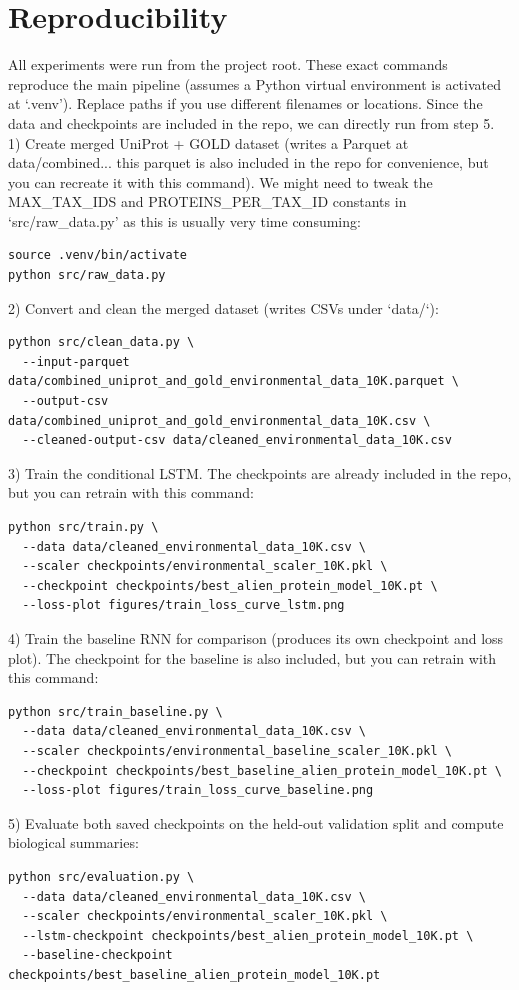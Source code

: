 \documentclass[11pt]{article}
\begin{document}
\section{Reproducibility}
All experiments were run from the project root. These exact commands reproduce
the main pipeline (assumes a Python virtual environment is activated at
`.venv'). Replace paths if you use different filenames or locations. Since 
the data and checkpoints are included in the repo, we can directly run from step 5.\\
1) Create merged UniProt + GOLD dataset (writes a Parquet at data/combined... this parquet is also included in the repo for convenience, but you can recreate it with this command). We might need to tweak the MAX\_TAX\_IDS and PROTEINS\_PER\_TAX\_ID constants in `src/raw\_data.py' as this is usually very time consuming:
\begin{verbatim}
source .venv/bin/activate
python src/raw_data.py
\end{verbatim}
2) Convert and clean the merged dataset (writes CSVs under `data/`):
\begin{verbatim}
python src/clean_data.py \
  --input-parquet data/combined_uniprot_and_gold_environmental_data_10K.parquet \
  --output-csv data/combined_uniprot_and_gold_environmental_data_10K.csv \
  --cleaned-output-csv data/cleaned_environmental_data_10K.csv
\end{verbatim}
3) Train the conditional LSTM. The checkpoints are already included in the repo, but you can retrain with this command:
\begin{verbatim}
python src/train.py \
  --data data/cleaned_environmental_data_10K.csv \
  --scaler checkpoints/environmental_scaler_10K.pkl \
  --checkpoint checkpoints/best_alien_protein_model_10K.pt \
  --loss-plot figures/train_loss_curve_lstm.png
\end{verbatim}
4) Train the baseline RNN for comparison (produces its own checkpoint and loss plot). The checkpoint for the baseline is also included, but you can retrain with this command:
\begin{verbatim}
python src/train_baseline.py \
  --data data/cleaned_environmental_data_10K.csv \
  --scaler checkpoints/environmental_baseline_scaler_10K.pkl \
  --checkpoint checkpoints/best_baseline_alien_protein_model_10K.pt \
  --loss-plot figures/train_loss_curve_baseline.png
\end{verbatim}
5) Evaluate both saved checkpoints on the held-out validation split and compute biological summaries:
\begin{verbatim}
python src/evaluation.py \
  --data data/cleaned_environmental_data_10K.csv \
  --scaler checkpoints/environmental_scaler_10K.pkl \
  --lstm-checkpoint checkpoints/best_alien_protein_model_10K.pt \
  --baseline-checkpoint checkpoints/best_baseline_alien_protein_model_10K.pt
\end{verbatim}
\end{document}
